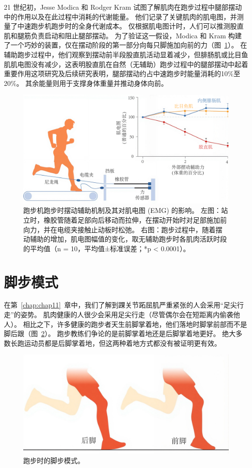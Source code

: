 21 世纪初，Jesse Modica 和 Rodger Kram 试图了解肌肉在跑步过程中腿部摆动中的作用以及在此过程中消耗的代谢能量。
他们记录了关键肌肉的肌电图，并测量了中速跑步机跑步时的全身代谢成本。
仅根据肌电图计时，人们可以推测股直肌和腿筋负责启动和阻止腿部摆动。
为了验证这一假设，Modica 和 Kram 构建了一个巧妙的装置，仅在摆动阶段的第一部分向每只脚施加向前的力（图~\ref{fig:12_8}）。
在辅助跑步过程中，他们观察到摆动前半段股直肌活动显着减少，但腓肠肌或比目鱼肌肌电图没有减少，这表明股直肌在自然（无辅助）跑步过程中的腿部摆动中起着重要作用这项研究及后续研究表明，腿部摆动约占中速跑步时能量消耗的10\%至20\%。
其余能量则用于支撑身体重量并推动身体向前。

\begin{figure}[!htb]
	\centering
	\includegraphics[width=1.0\linewidth]{chap12/12_8}
	\caption{跑步机跑步时摆动辅助机制及其对肌电图 (EMG) 的影响。
		左图：站立时，橡胶管随着足部向后移动而拉伸，在摆动开始时对足部施加前向力，并在电缆夹接触止动板时松弛。
		右图：跑步过程中，随着摆动辅助的增加，肌电图幅值的变化，取无辅助跑步时各肌肉活跃时段的平均值（n = 10，平均值±标准误差；*p < 0.0001）\cite{modica2005metabolic}。 \label{fig:12_8}}
\end{figure}



\section{脚步模式}

在第~\ref{chap:chap11}~章中，我们了解到踝关节跖屈肌严重紧张的人会采用“足尖行走”的姿势。
肌肉健康的人很少会采用足尖行走（尽管偶尔会在短距离内偷袭他人）。
相比之下，许多健康的跑步者天生前脚掌着地，他们落地时脚掌前部而不是脚后跟（图~\ref{fig:12_9}）。
跑步教练们争论的是前脚掌着地还是后脚掌着地更好。
绝大多数长跑运动员都是后脚掌着地，但这两种着地方式都没有被证明更有效。


\begin{figure}[!htb]
	\centering
	\includegraphics[width=0.5\linewidth]{chap12/12_9}
	\caption{跑步时的脚步模式。 \label{fig:12_9}}
\end{figure}


